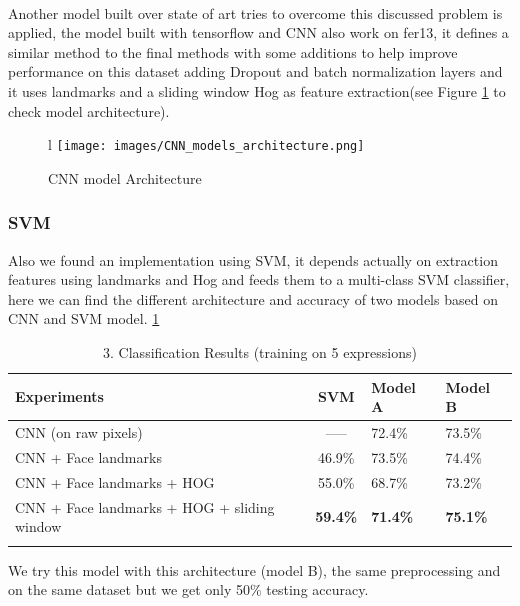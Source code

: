 \paragraph{}
Another model built over state of art tries to overcome this discussed problem is applied, the model built with tensorflow and CNN also work on fer13, it defines a similar method to the final methods with some additions to help improve performance on this dataset adding Dropout and batch normalization layers and it uses landmarks and a sliding window Hog as feature extraction(see Figure \ref{amine_arch} to check model architecture). \newline 
\begin{figure}{l}
	\centering
	\texttt{[image: images/CNN\_models\_architecture.png]}
	\caption{CNN model Architecture}
	\label{amine_arch}
\end{figure}
\subsubsection{SVM}
Also we found an implementation using SVM, it depends actually on extraction features using landmarks and Hog and feeds them to a multi-class SVM classifier, here we can find the different architecture and accuracy of two models based on CNN and SVM model. \ref{amine}

\begin{table}[h!]
	\begin{center}
		\caption{3. Classification Results (training on 5 expressions)\newline}
		\label{amine}
		\begin{tabular}{l|c|l|l}
			\textbf{Experiments} & \textbf{SVM}   & \textbf{Model A}   & \textbf{Model B}  \\
			\hline
			CNN (on raw pixels)	& -----   & 72.4\% & 73.5\% \\ 
			CNN + Face landmarks & 46.9\% &	73.5\% & 74.4\% \\
			CNN + Face landmarks + HOG & 55.0\% & 68.7\% & 73.2\% \\
			CNN + Face landmarks + HOG + sliding window & \textbf{59.4\%} &\textbf{71.4\%}&\textbf{75.1\%}\\
			& & 
		\end{tabular}
		
	\end{center}
\end{table}

We try this model with this architecture (model B), the same preprocessing and on the same dataset but we get only 50\% testing accuracy.

